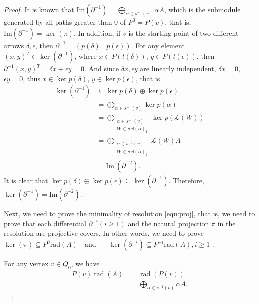 \documentclass[10pt,a4paper]{amsart}
\begin{document}
\begin{proof}
	It is known that \( \text{Im}(\partial^{-1}) = \bigoplus\limits_{\alpha \in s^{-1}(v)} \alpha A \), which is the submodule generated by all paths greater than 0 of \( P^0 = P(v) \), that is, \( \text{Im}(\partial^{-1}) = \ker(\pi) \). In addition, if \( v \) is the starting point of two different arrows \( \delta, \epsilon \), then \( \partial^{-1} = (p(\delta)~~~~p(\epsilon)) \). 
	For any element \( (x, y)^T \in \ker(\partial^{-1}) \), where \( x \in P(t(\delta)) \), \( y \in P(t(\epsilon)) \), then \( \partial^{-1}(x, y)^T = \delta x + \epsilon y = 0 \). And since \( \delta x, \epsilon y \) are linearly independent, \( \delta x = 0 \), \( \epsilon y = 0 \), thus \( x \in \ker p(\delta) \), \( y \in \ker p(\epsilon) \), that is
	\[
	\begin{aligned}
		\ker(\partial^{-1})  &\subseteq \ker p(\delta) \oplus \ker p(\epsilon) \\
		&= \bigoplus\limits_{\alpha \in s^{-1}(v)} \ker p(\alpha) \\
		&= \bigoplus\limits_{\substack{\alpha \in s^{-1}(v) \\ W \in \mathsf{Rel}(\alpha)_1}} \ker p(\mathscr{L}(W)) \\
		&= \bigoplus\limits_{\substack{\alpha \in s^{-1}(v) \\ W \in \mathsf{Rel}(\alpha)_2}} \mathscr{L}(W)A \\
		&= \text{Im}~(\partial^{-2}).
	\end{aligned}
	\]
	It is clear that \( \ker p(\delta) \oplus \ker p(\epsilon) \subseteq \ker(\partial^{-1}) \).
    Therefore, \( \ker(\partial^{-1}) = \text{Im}(\partial^{-2}) \).
	
	Next, we need to prove the minimality of resolution \ref{equ:proj}, that is, we need to prove that each differential \( \partial^{-i} (i \geq 1) \) and the natural projection \( \pi \) in the resolution are projective covers. 
	In other words, we need to prove 
    \( \ker(\pi) \subseteq P^0 \text{rad}(A) \)~~and~~~ \( \ker(\partial^{-i}) \subseteq P^{-i} \text{rad}(A) , i \geq 1 \) . 

	For any vertex \( v \in Q_0 \), we have 
	\begin{align*}
		P(v)\operatorname{rad}(A) &= \operatorname{rad}(P(v)) \\
		&= \bigoplus_{\alpha \in s^{-1}(v)} \alpha A .
	\end{align*}
	

\end{proof}
\end{document}
